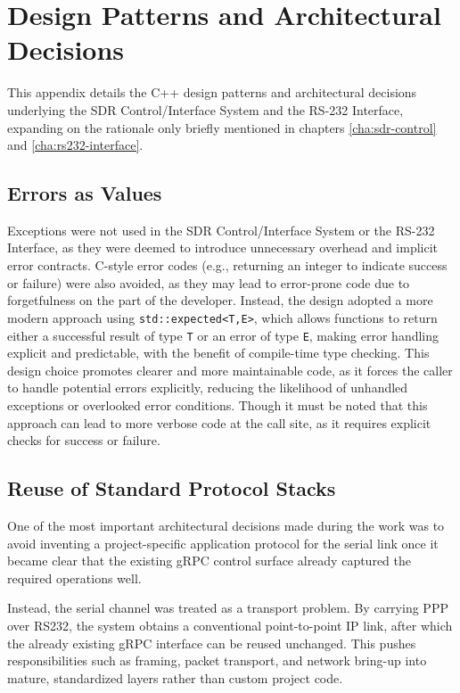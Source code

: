 \chapter{Design Patterns and Architectural Decisions}
\label{cha:design-patterns}

This appendix details the C++ design patterns and architectural decisions
underlying the SDR Control/Interface System and the RS-232 Interface,
expanding on the rationale only briefly mentioned in chapters
\autoref{cha:sdr-control} and \autoref{cha:rs232-interface}.


\section{Errors as Values}
\label{sec:design-patterns:errors}
Exceptions were not used in the SDR Control/Interface System or the RS-232
Interface, as they were deemed to introduce unnecessary overhead and implicit
error contracts. C-style error codes (e.g., returning an integer to indicate success or failure)
were also avoided, as they may lead to error-prone code due to forgetfulness on the part of the developer.
Instead, the design adopted a more modern approach using \texttt{std::expected<T,E>}, which allows functions to 
return either a successful result of type \texttt{T} or an error of type \texttt{E}, making error handling explicit and predictable, with the benefit of compile-time type checking.
This design choice promotes clearer and more maintainable code, as it forces the caller to handle potential errors explicitly, reducing the likelihood
of unhandled exceptions or overlooked error conditions.
Though it must be noted that this approach can lead to more verbose code at the call site, as it requires explicit checks for success or failure.


\section{Reuse of Standard Protocol Stacks}
\label{sec:design-patterns:reflection}
One of the most important architectural decisions made during the work was to
avoid inventing a project-specific application protocol for the serial link
once it became clear that the existing gRPC control surface already captured
the required operations well.

Instead, the serial channel was treated as a transport problem. By carrying
\gls{PPP} over \gls{RS232}, the system obtains a conventional point-to-point IP
link, after which the already existing gRPC interface can be reused unchanged.
This pushes responsibilities such as framing, packet transport, and network
bring-up into mature, standardized layers rather than custom project code.

